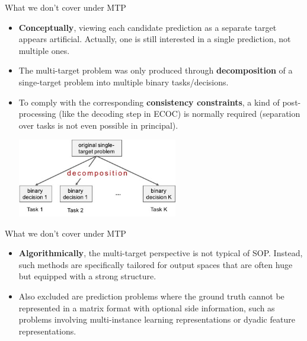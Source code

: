 \documentclass[]{beamer}
\renewcommand{\emph}[1]{\textbf{\color{putblue}#1}}
\begin{document}
\begin{frame}{What we don't cover under MTP}
\begin{itemize}

\item \emph{Conceptually}, viewing each candidate prediction as a separate target appears artificial. Actually, one is still interested in a single prediction, not multiple ones.

\item The multi-target problem was only produced through \emph{decomposition} of a singe-target problem into multiple binary tasks/decisions.   

\item To comply with the corresponding \emph{consistency constraints}, a kind of post-processing (like the decoding step in ECOC) is normally required (separation over tasks is not even possible in principal).

\medskip 


\begin{center}
\includegraphics[width=0.55\textwidth]{Figures/pictures/decomposition}
\end{center}

\end{itemize}
\end{frame}


\begin{frame}{What we don't cover under MTP}
\begin{itemize}

\item \emph{Algorithmically}, the multi-target perspective is not typical of SOP. Instead, such methods are specifically tailored for output spaces that are often huge but equipped with a strong structure. 

\medskip 
\item
Also excluded are prediction problems where the ground truth cannot be represented in a matrix format with optional side information, such as problems involving multi-instance learning representations or dyadic feature representations. 
\end{itemize}
\end{frame}
\end{document}
